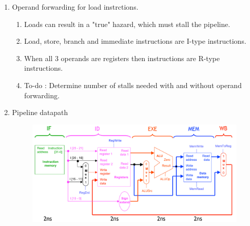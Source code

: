 \begin{enumerate}
    \newpage

    \item Operand forwarding for load instrctions.
    \begin{enumerate}
        \item Loads can result in a "true" hazard, which must stall the pipeline.
        \item Load, store, branch and immediate instructions are I-type instructions.
        \item When all 3 operands are registers then instructions are R-type instructions.
        \item To-do : Determine number of stalls needed with and without operand forwarding.
    \end{enumerate}

    \item Pipeline datapath \\
        \begin{figure}[h]
            \centering   \includegraphics[scale=0.5]{./images/pipeline_datapath.jpeg}
        \end{figure}

\end{enumerate}

